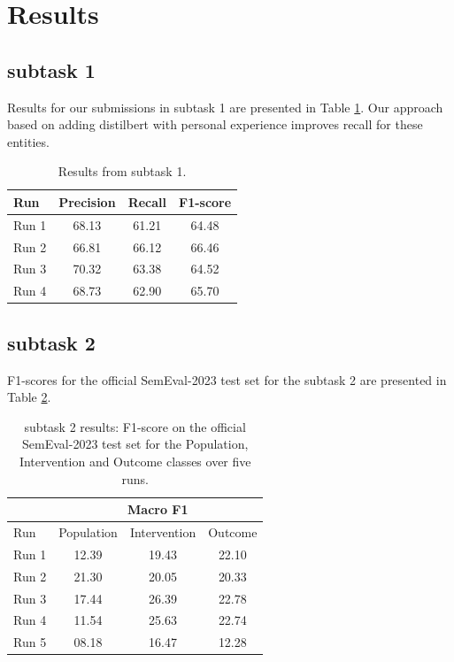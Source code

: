 \documentclass[11pt]{article}
\begin{document}
\section{Results}
\label{results}
%
%
%
\subsection{subtask 1}
\label{res:task1}
%
Results for our submissions in subtask 1 are presented in Table \ref{tab:task_1}. Our approach based on adding distilbert with personal experience improves recall for these entities.

\begin{table}[ht]
    \centering
    \begin{tabular}{lccc}
        \toprule
        Run & Precision & Recall & F1-score \\
        \midrule
        Run 1 & 68.13 & 61.21 & 64.48 \\
        Run 2 & 66.81 & 66.12 & 66.46 \\
        Run 3 & 70.32 & 63.38 & 64.52 \\
        Run 4 & 68.73 & 62.90 & 65.70 \\
        \bottomrule
    \end{tabular}
    \caption{Results from subtask 1.}
    \label{tab:task_1}
\end{table}
%
%
%
\subsection{subtask 2}
\label{res:task2}
%
F1-scores for the official SemEval-2023 test set for the subtask 2 are presented in Table \ref{tab:task_2}.

%
\begin{table}[ht]
    \centering
    \begin{tabular}{lccc}
        \toprule
          & \multicolumn{3}{c}{Macro F1} \\
         \hline
        Run & Population & Intervention & Outcome \\
        \midrule
        Run 1 & 12.39 & 19.43 & 22.10 \\
        Run 2 & 21.30 & 20.05 & 20.33 \\
        Run 3 & 17.44 & 26.39 & 22.78 \\
        Run 4 & 11.54 & 25.63 & 22.74 \\
        Run 5 & 08.18 & 16.47 & 12.28 \\
        \bottomrule
    \end{tabular}
    \caption{subtask 2 results: F1-score on the official SemEval-2023 test set for the Population, Intervention and Outcome classes over five runs.}
    \label{tab:task_2}
\end{table}
\end{document}
